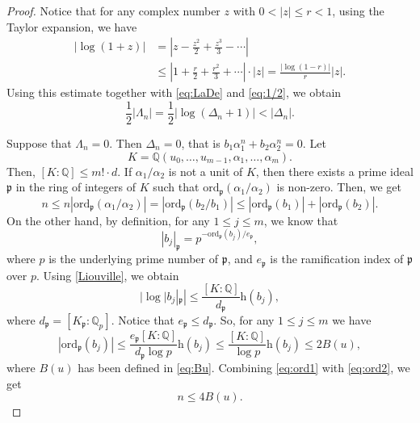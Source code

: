 \documentclass[12pt]{amsart}
\theoremstyle{definition}
\theoremstyle{remark}
\numberwithin{equation}{section}
\begin{document}
\begin{proof}
Notice that for any complex number $z$ with $0<|z| \le r <1$, using the Taylor expansion, we have 
\begin{align*}
|\log (1+z)| & = |z-\frac{z^2}{2}+\frac{z^3}{3}- \cdots | \\
& \le |1+\frac{r}{2}+\frac{r^2}{3}+\cdots |\cdot |z| =\frac{|\log (1-r)|}{r}|z|.
\end{align*}
 Using this estimate together with \eqref{eq:LaDe} and \eqref{eq:1/2}, we obtain
\begin{equation}
\label{eq:tran}
\frac{1}{2} |\Lambda_n | = \frac{1}{2} |\log (\Delta_n + 1) | < |\Delta_n | .
\end{equation}

Suppose that $\Lambda_n = 0$. Then $\Delta_n=0$, that is $b_1{\alpha}_1^n+b_2{\alpha}_2^n=0$.
Let
$$
K={{\mathbb Q}}(u_0,\ldots,u_{m-1},{\alpha}_1,\ldots,{\alpha}_m).
$$
 Then, $[K:{{\mathbb Q}}] \le m!\cdot d$. If ${\alpha}_1/{\alpha}_2$ is not a unit of $K$, then there exists a prime ideal ${\mathfrak{p}}$ in the ring of integers of $K$ such that  ${\mathrm{ord}}_{\mathfrak{p}} ({\alpha}_1/{\alpha}_2)$ is non-zero. Then, we get
 \begin{equation}
 \label{eq:ord1}
 n \le n | {\mathrm{ord}}_{\mathfrak{p}} ({\alpha}_1/{\alpha}_2) | = |{\mathrm{ord}}_{\mathfrak{p}} (b_2/b_1)|\le
 |{\mathrm{ord}}_{\mathfrak{p}} (b_1)| + |{\mathrm{ord}}_{\mathfrak{p}} (b_2)|.
 \end{equation}
 On the other hand, by definition, for any $1\le j \le m$, we know that
 $$
 |b_j|_{\mathfrak{p}}=p^{-{\mathrm{ord}}_{\mathfrak{p}}(b_j)/e_{\mathfrak{p}}},
 $$
 where $p$ is the underlying prime number of ${\mathfrak{p}}$, and $e_{\mathfrak{p}}$ is the ramification index of ${\mathfrak{p}}$ over $p$. Using \eqref{Liouville}, we obtain
 $$
 | \log |b_j|_{\mathfrak{p}} | \le \frac{[K:{{\mathbb Q}}]}{d_{\mathfrak{p}}}{\mathrm{h}}(b_j), 
 $$
 where $d_{\mathfrak{p}}=[K_{\mathfrak{p}} : {{\mathbb Q}}_p]$. Notice that $e_{\mathfrak{p}} \le d_{\mathfrak{p}}$. 
 So, for any $1\le j \le m$ we have
 \begin{equation}
 \label{eq:ord2}
| {\mathrm{ord}}_{\mathfrak{p}}(b_j) | \le \frac{e_{\mathfrak{p}}[K:{{\mathbb Q}}]}{d_{\mathfrak{p}} \log p} {\mathrm{h}}(b_j) \le
 \frac{[K:{{\mathbb Q}}]}{ \log p} {\mathrm{h}}(b_j) \le 2B(u),
 \end{equation}
  where $B(u)$ has been defined in \eqref{eq:Bu}.
 Combining \eqref{eq:ord1} with \eqref{eq:ord2}, we get
 \begin{equation}
 \label{eq:n01}
  n\le 4B(u).
 \end{equation}


\end{proof}
\end{document}
